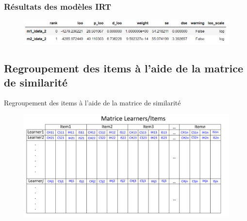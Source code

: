 \documentclass[aspectratio=169,professionalfonts, 12pt]{beamer}
\begin{document}
\begin{frame}
  \frametitle{Résultats des modèles IRT}
  \justifying
  \begin{minipage}{\textwidth}
    \begin{figure}[H]
      \begin{center}
        \includegraphics[scale=0.6]{images/etat_art/model_selection.png}
      \end{center}
    \end{figure}
  \end{minipage}
\end{frame}

\subsection{Regroupement des items à l’aide de la matrice de similarité}

\begin{frame}
  \justifying 
  \begin{minipage}{\textwidth}
    \begin{center}
      \huge Regroupement des items à l’aide de la matrice de similarité
    \end{center}
  \end{minipage}
\end{frame}

\begin{frame}
  \justifying 
  \begin{minipage}{\textwidth}
    \begin{figure}[H]
      \begin{center}
        \includegraphics[scale=0.18]{images/contribution/matrice_learners-items.png}
      \end{center}
    \end{figure}
  \end{minipage}
\end{frame}
\end{document}
